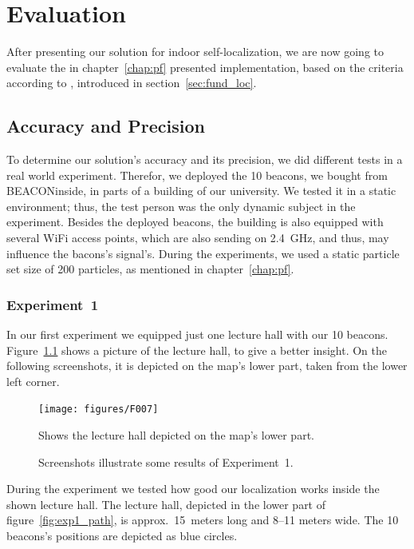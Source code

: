 \chapter{Evaluation} \label{chap:evaluation}
After presenting our solution for indoor self-localization, we are now going to evaluate the in chapter~\ref{chap:pf} presented implementation, based on the criteria according to \citet{IEEE:survey_wireless_indoor_pos}, introduced in section~\ref{sec:fund_loc}.

\section{Accuracy and Precision}
To determine our solution's accuracy and its precision, we did different tests in a real world experiment. Therefor, we deployed the 10 beacons, we bought from BEACONinside, in parts of a building of our university. We tested it in a static environment; thus, the test person was the only dynamic subject in the experiment. Besides the deployed beacons, the building is also equipped with several WiFi access points, which are also sending on 2.4~GHz, and thus, may influence the bacons's signal's. During the experiments, we used a static particle set size of 200 particles, as mentioned in chapter~\ref{chap:pf}.

\subsection*{Experiment~1}
In our first experiment we equipped just one lecture hall with our 10 beacons. Figure~\ref{fig:f007} shows a picture of the lecture hall, to give a better insight. On the following screenshots, it is depicted on the map's lower part, taken from the lower left corner.

\begin{figure}
	\texttt{[image: figures/F007]}
	\caption{Shows the lecture hall depicted on the map's lower part.}
	\label{fig:f007}
\end{figure}

\begin{figure}
	
	\caption{Screenshots illustrate some results of Experiment~1.}
	\label{fig:exp1_screenshot}
\end{figure}

During the experiment we tested how good our localization works inside the shown lecture hall. The lecture hall, depicted in the lower part of figure~\ref{fig:exp1_path}, is approx.\ 15~meters long and 8–11 meters wide. The 10 beacons's positions are depicted as blue circles.

